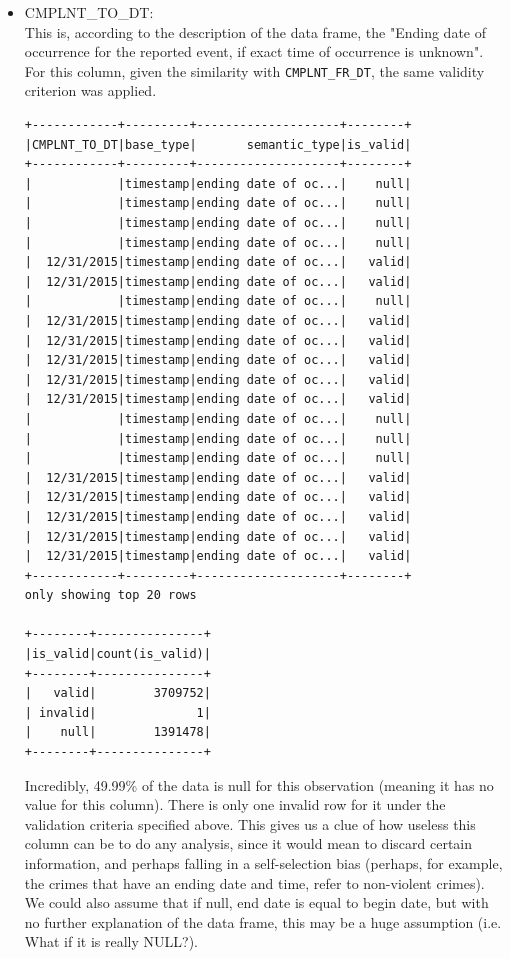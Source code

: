 \documentclass{article}
\begin{document}
\begin{itemize}
\item CMPLNT\_TO\_DT: \\
This is, according to the description of the data frame, the "Ending date of occurrence for the reported event, if exact time of occurrence is unknown". For this column, given the similarity with \texttt{CMPLNT\_FR\_DT}, the same validity criterion was applied. 
\begin{verbatim}
+------------+---------+--------------------+--------+
|CMPLNT_TO_DT|base_type|       semantic_type|is_valid|
+------------+---------+--------------------+--------+
|            |timestamp|ending date of oc...|    null|
|            |timestamp|ending date of oc...|    null|
|            |timestamp|ending date of oc...|    null|
|            |timestamp|ending date of oc...|    null|
|  12/31/2015|timestamp|ending date of oc...|   valid|
|  12/31/2015|timestamp|ending date of oc...|   valid|
|            |timestamp|ending date of oc...|    null|
|  12/31/2015|timestamp|ending date of oc...|   valid|
|  12/31/2015|timestamp|ending date of oc...|   valid|
|  12/31/2015|timestamp|ending date of oc...|   valid|
|  12/31/2015|timestamp|ending date of oc...|   valid|
|  12/31/2015|timestamp|ending date of oc...|   valid|
|            |timestamp|ending date of oc...|    null|
|            |timestamp|ending date of oc...|    null|
|            |timestamp|ending date of oc...|    null|
|  12/31/2015|timestamp|ending date of oc...|   valid|
|  12/31/2015|timestamp|ending date of oc...|   valid|
|  12/31/2015|timestamp|ending date of oc...|   valid|
|  12/31/2015|timestamp|ending date of oc...|   valid|
|  12/31/2015|timestamp|ending date of oc...|   valid|
+------------+---------+--------------------+--------+
only showing top 20 rows

+--------+---------------+
|is_valid|count(is_valid)|
+--------+---------------+
|   valid|        3709752|
| invalid|              1|
|    null|        1391478|
+--------+---------------+
\end{verbatim}

Incredibly, 49.99\% of the data is null for this observation (meaning it has no value for this column). There is only one invalid row for it under the validation criteria specified above. This gives us a clue of how useless this column can be to do any analysis, since it would mean to discard certain information, and perhaps falling in a self-selection bias (perhaps, for example, the crimes that have an ending date and time, refer to non-violent crimes). We could also assume that if null, end date is equal to begin date, but with no further explanation of the data frame, this may be a huge assumption (i.e. What if it is really NULL?).


\end{itemize}
\end{document}
